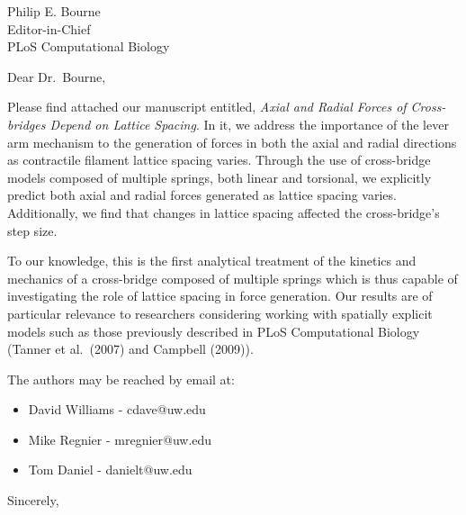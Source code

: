 \documentclass[10pt]{letter}
\begin{document}
\begin{letter}{Philip E. Bourne\\ Editor-in-Chief\\ PLoS Computational Biology}

\opening{Dear Dr.~Bourne,}

Please find attached our manuscript entitled, \emph{Axial and Radial Forces of Cross-bridges Depend on Lattice Spacing}. 
In it, we address the importance of the lever arm mechanism to the generation of forces in both the axial and radial directions as contractile filament lattice spacing varies.
Through the use of cross-bridge models composed of multiple springs, both linear and torsional, we explicitly predict both axial and radial forces generated as lattice spacing varies. 
Additionally, we find that changes in lattice spacing affected the cross-bridge's step size.

To our knowledge, this is the first analytical treatment of the kinetics and mechanics of a cross-bridge composed of multiple springs which is thus capable of investigating the role of lattice spacing in force generation. 
Our results are of particular relevance to researchers considering working with spatially explicit models such as those previously described in PLoS Computational Biology (Tanner et al.~(2007) and Campbell (2009)).

The authors may be reached by email at: 
\begin{itemize}
    \item David Williams - cdave@uw.edu
    \item Mike Regnier - mregnier@uw.edu
    \item Tom Daniel - danielt@uw.edu
\end{itemize}

\closing{Sincerely,}

\end{letter}
\end{document}
